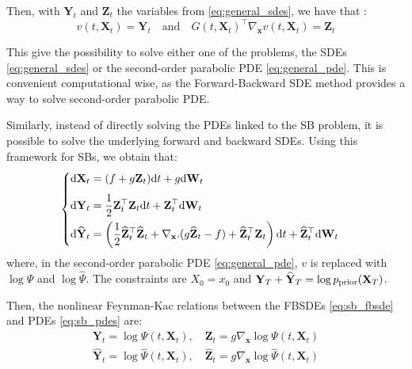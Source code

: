 \documentclass{article}
\begin{document}
Then, with $\mathbf{Y}_t$ and $\mathbf{Z}_t$ the variables from \eqref{eq:general_sdes}, we have that :
\[
v(t,\mathbf{X}_t) = \mathbf{Y}_t \quad \text{and} \quad G(t,\mathbf{X}_t)^\top \nabla_\mathbf{x}v(t,\mathbf{X}_t) = \mathbf{Z}_t
\]

This give the possibility to solve either one of the problems, the SDEs \eqref{eq:general_sdes} or the second-order parabolic PDE \eqref{eq:general_pde}.
This is convenient computational wise, as the Forward-Backward SDE method \citep{pmlr-v120-pereira20a} provides a way to solve second-order parabolic PDE.

Similarly, instead of directly solving the PDEs linked to the SB problem, it is possible to solve the underlying forward and backward SDEs. Using this framework for SBs, we obtain that:
\begin{equation}
    \label{eq:sb_fbsde}
    \begin{cases}
        \displaystyle \mathrm{d}\mathbf{X}_t = (f+g\mathbf{Z}_t) \mathrm{d} t + g \mathrm{d} \mathbf{W}_t
        \\[7pt]
        \displaystyle \mathrm{d}\mathbf{Y}_t = \frac{1}{2}\mathbf{Z}_t^\top\mathbf{Z}_t\mathrm{d} t + \mathbf{Z}_t^\top\mathrm{d}\mathbf{W}_t
        \\[7pt]
        \displaystyle \mathrm{d}\widehat{\mathbf{Y}}_t = \left( 
        \frac{1}{2}\widehat{\mathbf{Z}}_t^\top\widehat{\mathbf{Z}}_t
        + \nabla_\mathbf{x} . (g\widehat{\mathbf{Z}}_t - f)
        + \widehat{\mathbf{Z}}_t^\top \mathbf{Z}_t \right) \mathrm{d} t
        + \widehat{\mathbf{Z}}_t^\top\mathrm{d}\mathbf{W}_t
    \end{cases}
\end{equation}
where, in the second-order parabolic PDE \eqref{eq:general_pde}, $v$ is replaced with $\log \Psi$ and $\log\widehat\Psi$. The constraints are $X_0 = x_0$ and $\mathbf{Y}_T + \widehat{\mathbf{Y}}_T = \log p_{\rm prior}(\mathbf{X}_T)$.

Then, the nonlinear Feynman-Kac relations between the FBSDEs \eqref{eq:sb_fbsde} and PDEs \eqref{eq:sb_pdes} are:
\begin{equation*}
\begin{aligned}
    \mathbf{Y}_t = \log\Psi(t,\mathbf{X}_t), \quad \mathbf{Z}_t = g \nabla_\mathbf{x}\log \Psi(t,\mathbf{X}_t)\\
    \widehat{\mathbf{Y}}_t = \log\widehat\Psi(t,\mathbf{X}_t), \quad \widehat{\mathbf{Z}}_t = g\nabla_\mathbf{x}\log\widehat\Psi(t,\mathbf{X}_t)
\end{aligned}
\end{equation*}
\end{document}
